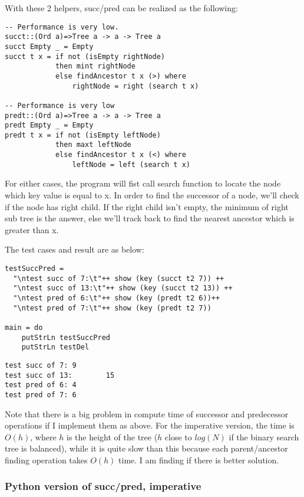 \documentclass{article}
\begin{document}
With these 2 helpers, succ/pred can be realized as the following:
\begin{lstlisting}
-- Performance is very low.
succt::(Ord a)=>Tree a -> a -> Tree a
succt Empty _ = Empty
succt t x = if not (isEmpty rightNode)
            then mint rightNode
            else findAncestor t x (>) where
                rightNode = right (search t x)

-- Performance is very low
predt::(Ord a)=>Tree a -> a -> Tree a
predt Empty _ = Empty
predt t x = if not (isEmpty leftNode)
            then maxt leftNode
            else findAncestor t x (<) where
                leftNode = left (search t x)
\end{lstlisting}

For either cases, the program will fist call search function to locate the node
which key value is equal to x. In order to find the successor of a node, we'll 
check if the node has right child. If the right child isn't empty, the minimum 
of right sub tree is the answer, else we'll track back to find the nearest 
ancestor which is greater than x.

The test cases and result are as below:
\begin{lstlisting}
testSuccPred = 
  "\ntest succ of 7:\t"++ show (key (succt t2 7)) ++
  "\ntest succ of 13:\t"++ show (key (succt t2 13)) ++
  "\ntest pred of 6:\t"++ show (key (predt t2 6))++
  "\ntest pred of 7:\t"++ show (key (predt t2 7))

main = do
    putStrLn testSuccPred
    putStrLn testDel
\end{lstlisting}

\begin{verbatim}
test succ of 7: 9
test succ of 13:        15
test pred of 6: 4
test pred of 7: 6
\end{verbatim}

Note that there is a big problem in compute time of successor and predecessor 
operations if I implement them as above. For the imperative version, the time
is $O(h)$, where $h$ is the height of the tree ($h$ close to $log(N)$ if the
binary search tree is balanced), while it is quite slow than this because each
parent/ancestor finding operation takes $O(h)$ time. I am finding if there is 
better solution.

\subsubsection*{Python version of succ/pred, imperative}
\end{document}
